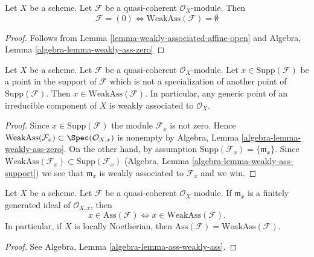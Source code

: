 \begin{lemma}
\label{lemma-weakly-ass-zero}
Let $X$ be a scheme.
Let $\mathcal{F}$ be a quasi-coherent $\mathcal{O}_X$-module.
Then
$$
\mathcal{F} = (0) \Leftrightarrow \text{WeakAss}(\mathcal{F}) = \emptyset
$$
\end{lemma}

\begin{proof}
Follows from
Lemma \ref{lemma-weakly-associated-affine-open}
and
Algebra, Lemma \ref{algebra-lemma-weakly-ass-zero}
\end{proof}

\begin{lemma}
\label{lemma-minimal-support-in-weakly-ass}
Let $X$ be a scheme.
Let $\mathcal{F}$ be a quasi-coherent $\mathcal{O}_X$-module.
Let $x \in \text{Supp}(\mathcal{F})$ be a point in the support
of $\mathcal{F}$ which is not a specialization of another point of
$\text{Supp}(\mathcal{F})$. Then
$x \in \text{WeakAss}(\mathcal{F})$.
In particular, any generic point of an irreducible component of $X$
is weakly associated to $\mathcal{O}_X$.
\end{lemma}

\begin{proof}
Since $x \in \text{Supp}(\mathcal{F})$ the module $\mathcal{F}_x$
is not zero. Hence
$\text{WeakAss}(\mathcal{F}_x) \subset \Spec(\mathcal{O}_{X, x})$
is nonempty by
Algebra, Lemma \ref{algebra-lemma-weakly-ass-zero}.
On the other hand, by assumption
$\text{Supp}(\mathcal{F}_x) = \{\mathfrak m_x\}$.
Since
$\text{WeakAss}(\mathcal{F}_x) \subset \text{Supp}(\mathcal{F}_x)$
(Algebra, Lemma \ref{algebra-lemma-weakly-ass-support})
we see that $\mathfrak m_x$ is weakly associated to $\mathcal{F}_x$
and we win.
\end{proof}

\begin{lemma}
\label{lemma-ass-weakly-ass}
Let $X$ be a scheme.
Let $\mathcal{F}$ be a quasi-coherent $\mathcal{O}_X$-module.
If $\mathfrak m_x$ is a finitely generated ideal of $\mathcal{O}_{X, x}$,
then
$$
x \in \text{Ass}(\mathcal{F}) \Leftrightarrow
x \in \text{WeakAss}(\mathcal{F}).
$$
In particular, if $X$ is locally Noetherian, then
$\text{Ass}(\mathcal{F}) = \text{WeakAss}(\mathcal{F})$.
\end{lemma}

\begin{proof}
See
Algebra, Lemma \ref{algebra-lemma-ass-weakly-ass}.
\end{proof}



